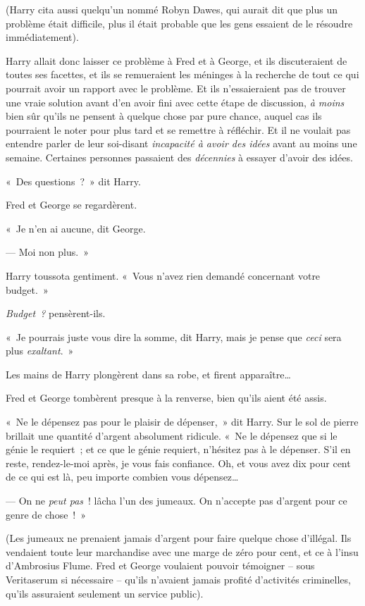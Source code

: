 (Harry cita aussi quelqu'un nommé Robyn Dawes, qui aurait dit que plus un problème était difficile, plus il était probable que les gens essaient de le résoudre immédiatement).

Harry allait donc laisser ce problème à Fred et à George, et ils discuteraient de toutes ses facettes, et ils se remueraient les méninges à la recherche de tout ce qui pourrait avoir un rapport avec le problème.
Et ils n'essaieraient pas de trouver une vraie solution avant d'en avoir fini avec cette étape de discussion, \emph{à moins} bien sûr qu'ils ne pensent à quelque chose par pure chance, auquel cas ils pourraient le noter pour plus tard et se remettre à réfléchir.
Et il ne voulait pas entendre parler de leur soi-disant \emph{incapacité à avoir des idées} avant au moins une semaine.
Certaines personnes passaient des \emph{décennies} à essayer d'avoir des idées.

«~Des questions~?~»
dit Harry.

Fred et George se regardèrent.

«~Je n'en ai aucune, dit George.

--- Moi non plus.~»

Harry toussota gentiment.
«~Vous n'avez rien demandé concernant votre budget.~»

\emph{Budget~?} pensèrent-ils.

«~Je pourrais juste vous dire la somme, dit Harry, mais je pense que \emph{ceci} sera plus \emph{exaltant}.~»

Les mains de Harry plongèrent dans sa robe, et firent apparaître…

Fred et George tombèrent presque à la renverse, bien qu'ils aient été assis.

«~Ne le dépensez pas pour le plaisir de dépenser,~» dit Harry.
Sur le sol de pierre brillait une quantité d'argent absolument ridicule.
«~Ne le dépensez que si le génie le requiert~; et ce que le génie requiert, n'hésitez pas à le dépenser.
S'il en reste, rendez-le-moi après, je vous fais confiance.
Oh, et vous avez dix pour cent de ce qui est là, peu importe combien vous dépensez…

--- On ne \emph{peut pas}~! lâcha l'un des jumeaux.
On n'accepte pas d'argent pour ce genre de chose~!~»

(Les jumeaux ne prenaient jamais d'argent pour faire quelque chose d'illégal.
Ils vendaient toute leur marchandise avec une marge de zéro pour cent, et ce à l'insu d'Ambrosius Flume.
Fred et George voulaient pouvoir témoigner -- sous Veritaserum si nécessaire -- qu'ils n'avaient jamais profité d'activités criminelles, qu'ils assuraient seulement un service public).


